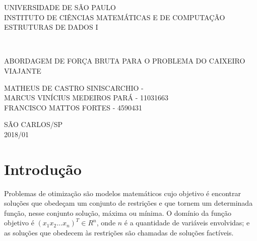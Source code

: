 \documentclass[a4paper, 12pt]{article} %
\date{2018}
\begin{document}
	\begin{titlepage}
\flushleft
	
		\begin{minipage}{1\linewidth}
	\centering
	
			UNIVERSIDADE DE SÃO PAULO\\
			INSTITUTO DE CIÊNCIAS  MATEMÁTICAS E DE COMPUTAÇÃO\\
			ESTRUTURAS DE DADOS I\\
			\end{minipage}
			\\[6.7 cm]
			\begin{center}
			ABORDAGEM DE FORÇA BRUTA PARA O PROBLEMA DO CAIXEIRO VIAJANTE\\[5 cm]
			\end{center}
			\begin{flushleft}
				
				MATHEUS DE CASTRO SINISCARCHIO - \\
				MARCUS VINÍCIUS MEDEIROS PARÁ - 11031663\\
				FRANCISCO MATTOS FORTES - 4590431\\ \vspace{\fill}
			\end{flushleft}
		\begin{center}
			SÃO CARLOS/SP\\2018/01
		\end{center}
		

	\end{titlepage}
	\renewcommand{\contentsname}{\normalsize{SUMÁRIO}}
	\tableofcontents
	
	\newpage
	
	\section{Introdução}
	
	
	Problemas de otimização são modelos matemáticos cujo objetivo é encontrar soluções que obedeçam um conjunto de restrições e que tornem um determinada função, nesse conjunto solução, máxima ou mínima. O domínio da função objetivo é $( x_1 x_2 ... x_n)^T \in R^n$, onde $n$ é a quantidade de variáveis envolvidas; e as soluções que obedecem às restrições são chamadas de soluções factíveis.
	
\end{document}
